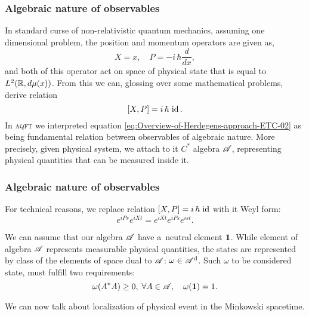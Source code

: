 \documentclass[10pt,t]{beamer}
\begin{document}
\begin{frame}
  \frametitle{Algebraic nature of observables}


  In standard curse of non-relativistic quantum mechanics, assuming
  one dimensional problem, the position and
  momentum operators are given as,
  \begin{equation}
    \label{eq:Overview-of-Herdegens-approach-ETC-01}
    X = x, \quad
    P = -i \, \hbar \frac{ d }{ dx },
  \end{equation}
  and both of this operator act on space of physical state that is equal
  to $L^{ 2 }( \mathbb{R}, d\mu( x ) )$. From this we can, glossing over some
  mathematical problems, derive relation
  \begin{equation}
    \label{eq:Overview-of-Herdegens-approach-ETC-02}
    [ X, P ] = i \, \hbar \, \operatorname{id}.
  \end{equation}
  In \textsc{aqft} we interpreted equation
  \eqref{eq:Overview-of-Herdegens-approach-ETC-02} as being fundamental
  relation between observables of algebraic nature. More precisely, given
  physical system, we attach to it $C^{ * }$ algebra $\mathcal{A}$, representing
  physical quantities that can be measured inside it.

\end{frame}





\begin{frame}
  \frametitle{Algebraic nature of observables}


  For technical reasons, we replace relation $[ X, P ] = i \, \hbar \, \operatorname{id}$
  with it Weyl form:
  \begin{equation}
    \label{eq:Overview-of-Herdegens-approach-ETC-03}
    e^{ i P s } e^{ i X t } = e^{ i X t } e^{ i P s } e^{ i s t }.
  \end{equation}

  We can assume that our algebra $\mathcal{A}$ have a~neutral element $\mathbf{1}$.
  While element of algebra $\mathcal{A}$ represents measurable physical
  quantities, the states are represented by class of the elements of space
  dual to $\mathcal{A}$: $\omega \in \mathcal{A}^{ \text{d} }$. Such $\omega$ to be considered state,
  must fulfill two requirements:
  \begin{equation}
    \label{eq:Overview-of-Herdegens-approach-ETC-04}
    \omega( A^{ * } A ) \geq 0, \; \forall A \in \mathcal{A}, \quad
    \omega( \mathbf{1} ) = 1.
  \end{equation}

  We can now talk about localization of physical event in the Minkowski
  spacetime.

\end{frame}
\end{document}
